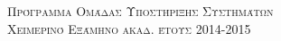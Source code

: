 \documentclass[landscape,letterpaper]{article}
\begin{document}
\pagestyle{empty} %

\noindent



\begin{center}
\textsc{\Huge Πρόγραμμα Ομάδας Υποστήριξης Συστημάτων}\\ %
\vspace{3pt}
\textsc{\LARGE Χειμερινό Εξάμηνο ακαδ. έτους 2014-2015}\\ %
\end{center}
\vspace{2pt}

\end{document}
